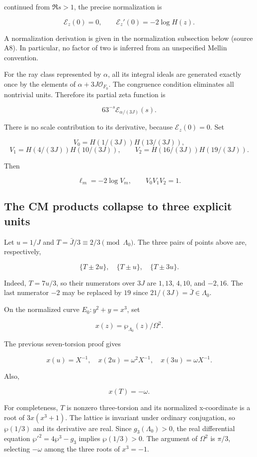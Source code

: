 continued from \(\Re s>1\), the precise normalization is

\[
\mathcal E_z(0)=0,\qquad \mathcal E_z'(0)=-2\log H(z). \tag{A4.2}
\]

A normalization derivation is given in the normalization subsection below (source A8). In particular, no
factor of two is inferred from an unspecified Mellin convention.

For the ray class represented by \(\alpha\), all its integral ideals are
generated exactly once by the elements of \(\alpha+3J\mathscr O_{F_0}\).
The congruence condition eliminates all nontrivial units. Therefore its
partial zeta function is

\[
63^{-s}\mathcal E_{\alpha/(3J)}(s).
\]

There is no scale contribution to its derivative, because
\(\mathcal E_z(0)=0\). Set

\[
V_0=H(1/(3J))H(13/(3J)),
\] \[
V_1=H(4/(3J))H(10/(3J)),\qquad
V_2=H(16/(3J))H(19/(3J)).
\]

Then

\[
\ell_m=-2\log V_m,
\qquad V_0V_1V_2=1. \tag{A4.3}
\]

\hypertarget{A-the-cm-products-collapse-to-three-explicit-units}{%
\subsection{The CM products collapse to three explicit
units}\label{A-the-cm-products-collapse-to-three-explicit-units}}

Let \(u=1/J\) and \(T=\bar J/3\equiv2/3\pmod{\Lambda_0}\). The three
pairs of points above are, respectively,

\[
\{T\pm2u\},\quad\{T\pm u\},\quad\{T\pm3u\}. \tag{A5.1}
\]

Indeed, \(T=7u/3\), so their numerators over \(3J\) are \(1,13\),
\(4,10\), and \(-2,16\). The last numerator \(-2\) may be replaced by
\(19\) since \(21/(3J)=\bar J\in\Lambda_0\).

On the normalized curve \(E_0:y^2+y=x^3\), set

\[
x(z)=\wp_{\Lambda_0}(z)/\Omega^2.
\]

The previous seven-torsion proof gives

\[
x(u)=X^{-1},\quad x(2u)=\omega^2X^{-1},\quad x(3u)=\omega X^{-1}. \tag{A5.2}
\]

Also,

\[
x(T)=-\omega. \tag{A5.3}
\]

For completeness, \(T\) is nonzero three-torsion and its normalized
x-coordinate is a root of \(3x(x^3+1)\). The lattice is invariant under
ordinary conjugation, so \(\wp(1/3)\) and its derivative are real. Since
\(g_3(\Lambda_0)>0\), the real differential equation
\(\wp'^2=4\wp^3-g_3\) implies \(\wp(1/3)>0\). The argument of
\(\Omega^2\) is \(\pi/3\), selecting \(-\omega\) among the three roots
of \(x^3=-1\).

